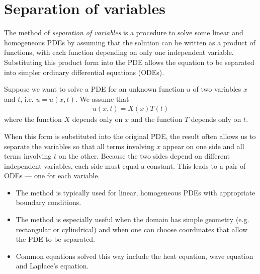 \section{Separation of variables}
    The method of \textit{separation of variables} is a procedure to solve some linear and homogeneous PDEs by assuming that the solution can be written as a product of functions, with each function depending on only one independent variable. Substituting this product form into the PDE allows the equation to be separated into simpler ordinary differential equations (ODEs).

    Suppose we want to solve a PDE for an unknown function $u$ of two variables $x$ and $t$, i.e. $u=u(x,t)$. We assume that
    \begin{align*}
        u(x,t)=X(x)T(t)
    \end{align*}
    where the function $X$ depends only on $x$ and the function $T$ depends only on $t$.

    When this form is substituted into the original PDE, the result often allows us to separate the variables so that all terms involving $x$ appear on one side and all terms involving $t$ on the other. Because the two sides depend on different independent variables, each side must equal a constant. This leads to a pair of ODEs --- one for each variable.

    \begin{itemize}
        \item The method is typically used for linear, homogeneous PDEs with appropriate boundary conditions.
        \item The method is especially useful when the domain has simple geometry (e.g. rectangular or cylindrical) and when one can choose coordinates that allow the PDE to be separated.
        \item Common equations solved this way include the heat equation, wave equation and Laplace's equation.
    \end{itemize}

